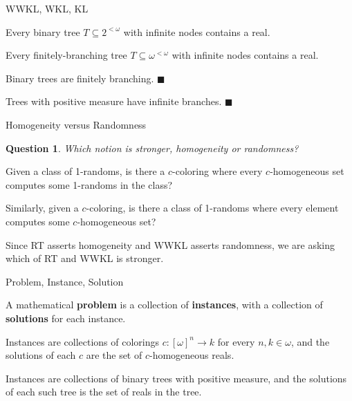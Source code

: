 \begin{frame}{WWKL, WKL, KL}
  \begin{thm*}
    Every binary tree $T\subseteq2^{<\omega}$ with infinite nodes contains
    a real.
  \end{thm*}

  \begin{thm*}
    Every finitely-branching tree $T\subseteq\omega^{<\omega}$ with
    infinite nodes contains a real.
  \end{thm*}

  \begin{observe*}
    Binary trees are finitely branching. $\blacksquare$
  \end{observe*}

  \begin{observe*}
    Trees with positive measure have infinite branches. $\blacksquare$
  \end{observe*}
\end{frame}

\begin{frame}{Homogeneity versus Randomness}
  \newtheorem*{question*}{Question}
  \begin{question*}
    Which notion is stronger, homogeneity or randomness?
  \end{question*}

  \vspace{2em}
  Given a class of 1-randoms, is there a $c$-coloring where every
  $c$-homogeneous set computes some 1-randoms in the class?

  \vspace{2em}
  Similarly, given a $c$-coloring, is there a class of 1-randoms where
  every element computes some $c$-homogeneous set?

  \vspace{2em}
  Since RT asserts homogeneity and WWKL asserts randomness, we are asking
  which of RT and WWKL is stronger.
\end{frame}

\begin{frame}{Problem, Instance, Solution}
  \begin{define*}
    A mathematical \textbf{problem} is a collection of \textbf{instances},
    with a collection of \textbf{solutions} for each instance.
  \end{define*}

  \begin{example*}[RT is a problem]
    Instances are collections of colorings $c:[\omega]^n\rightarrow k$ for
    every $n,k\in\omega$, and the solutions of each $c$ are the set of
    $c$-homogeneous reals.
  \end{example*}

  \begin{example*}
    Instances are collections of binary trees with positive measure,
    and the solutions of each such tree is the set of reals in the tree.
  \end{example*}
\end{frame}

